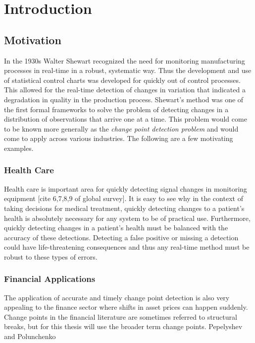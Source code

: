 \chapter{Introduction}
\section{Motivation}
In the 1930s Walter Shewart recognized the need for monitoring manufacturing processes in real-time in a robust, systematic way. Thus the development and use of statistical control charts was developed for quickly out of control processes. This allowed for the real-time detection of changes in variation that indicated a degradation in quality in the production process. Shewart's method was one of the first formal frameworks to solve the problem of detecting changes in a distribution of observations that arrive one at a time. This problem would come to be known more generally as the \textit{change point detection problem} and would come to apply across various industries. The following are a few motivating examples.

\subsection{Health Care}
Health care is important area for quickly detecting signal changes in monitoring equipment [cite 6,7,8,9 of global survey]. It is easy to see why in the context of taking decisions for medical treatment, quickly detecting changes to a patient's health is absolutely necessary for any system to be of practical use. Furthermore, quickly detecting changes in a patient's health must be balanced with the accuracy of these detections. Detecting a false positive or missing a detection could have life-threatening consequences and thus any real-time method must be robust to these types of errors.


\subsection{Financial Applications}
The application of accurate and timely change point detection is also very appealing to the finance sector where shifts in asset prices can happen suddenly. Change points in the financial literature are sometimes referred to structural breaks, but for this thesis will use the broader term change points. Pepelyshev and Polunchenko \cite{pepelyshev2015real}

